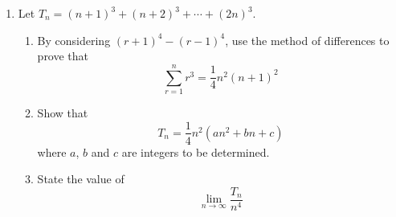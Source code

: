 \documentclass[leqno]{article}
\newcommand{\cxl}[2]{%
  \tikz[baseline=(X.base)]{%
    \node[inner sep=0pt, outer sep=0pt, text=#1] (X) {$#2$};
    \draw[#1, line width=0.4pt] (X.south west)--(X.north east);
  }%
}
\newcommand{\questionitem}{%
  \item\phantomsection
  \addcontentsline{toc}{section}{Question \number\value{enumi}}%
}
\begin{document}
\begin{enumerate}[
  label=\textbf{\arabic*.},
  leftmargin=*,
  topsep=0pt,
  partopsep=0pt,
  parsep=0pt
]
\begin{tcolorbox}[colback=white, colframe=scarlet, title={\textbf{Solution}}, breakable, grow to left by=6mm, grow to right by=10mm]
So
\[
S_n=\sum_{r=1}^{n}\left(\frac{3}{r(r+1)}-\frac{3}{(r+1)(r+2)}\right)
\]

Now use the method of differences by writing out the first few and last few terms:
\begin{align*}
S_n
&=\left(\frac{3}{1\cdot2}-\cxl{blue}{\frac{3}{2\cdot3}}\right)
+\left(\cxl{blue}{\frac{3}{2\cdot3}}-\cxl{red}{\frac{3}{3\cdot4}}\right)
+\left(\cxl{red}{\frac{3}{3\cdot4}}-\cxl{teal}{\frac{3}{4\cdot5}}\right)
+\cdots \\
&\qquad
+\left(\cxl{violet}{\frac{3}{(n-1)n}}-\cxl{orange}{\frac{3}{n(n+1)}}\right)
+\left(\cxl{orange}{\frac{3}{n(n+1)}}-\frac{3}{(n+1)(n+2)}\right)
\end{align*}

All the coloured pairs cancel, leaving
\[
S_n=\frac{3}{1\cdot2}-\frac{3}{(n+1)(n+2)}
\]

So
\[
S_n=\frac{3}{2}-\frac{3}{(n+1)(n+2)}
\]

Put this over the common denominator \(2(n+1)(n+2)\):
\begin{align*}
S_n
&=\frac{3(n+1)(n+2)-6}{2(n+1)(n+2)} \\
&=\frac{3(n^2+3n+2)-6}{2(n+1)(n+2)} \\
&=\frac{3n^2+9n}{2(n+1)(n+2)} \\
&=\frac{3n(n+3)}{2(n+1)(n+2)}
\end{align*}

We are told this has the form
\[
\frac{n(an+b)}{2(n+1)(n+2)}
\]

Hence
\[
n(an+b)=3n(n+3)=n(3n+9)
\]

Since \(n\) is a positive integer, \(n\neq 0\), so
\[
an+b=3n+9
\]

Therefore
\[
a=3,\qquad b=9
\]

Hence
\[
\sum_{r=1}^{n}\frac{6}{r(r+1)(r+2)}=\frac{3n(n+3)}{2(n+1)(n+2)}
=\frac{n(3n+9)}{2(n+1)(n+2)}
\]
so the required constants are \(a=3\) and \(b=9\).
\end{tcolorbox}


\newpage

\questionitem

Let $T_n = (n+1)^3 + (n+2)^3 + \cdots + (2n)^3$. \\
\begin{enumerate}[label=\textbf{(\alph*)}]
  \item By considering $(r+1)^4-(r-1)^4$, use the method of differences to prove that
  \[
  \sum_{r=1}^{n} r^3 = \frac{1}{4}n^2(n+1)^2
  \]
  \item Show that \[T_n = \frac{1}{4}n^2(an^2+bn+c)\] where $a$, $b$ and $c$ are integers to be determined.  \\
  \item State the value of \[\lim_{n \to \infty} \frac{T_n}{n^4}\]  \\
\end{enumerate}


\end{enumerate}
\end{document}
